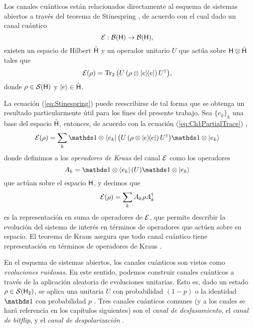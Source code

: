 Los canales cuánticos están relacionados directamente al esquema de sistemas abiertos a través del teorema de Stinespring \cite{Watrous}, de acuerdo con el cual dado un canal cuántico
\begin{equation}
    \mathcal{E}:\mathcal{B}({\sf H})\rightarrow \mathcal{B}({\sf H}),\nonumber
\end{equation}    
existen un espacio de Hilbert $\tilde {{\sf H}}$ y un operador unitario $U$ que actúa sobre ${\sf H}\otimes \tilde {{\sf H}}$ tales que
\begin{equation}\label{eq:Stinespring}
    \mcE(\rho)=\Tr_{2}\qty(U  \left(\rho \otimes \dyad{e}\right) U^{\dag}),
\end{equation}
donde $\rho\in\mathcal{S}({\sf H})$ y $\ket{e}\in \tilde {{\sf H}}$. \acnote{\checkmark}

La ecuación (\ref{eq:Stinespring}) puede reescribirse de tal forma que se obtenga un resultado particularmente útil para los fines del presente trabajo. Sea $\{e_{k}\}_{k}$ una base del espacio $\tilde {{\sf H}}$, entonces, de acuerdo con la ecuación (\ref{eq:Ch1PartialTrace}) \cite{Chuang},
\begin{equation}
    \mcE(\rho)=\sum_{k} \Id\otimes\bra{e_{k}} \qty(U  \left(\rho \otimes \dyad{e}\right) U^{\dag})\Id\otimes\ket{e_{k}}\nonumber
\end{equation}
donde definimos a los \textit{operadores de Kraus} del canal $\mathcal{E}$ como los operadores
\begin{equation}
    A_{k}=\Id\otimes\bra{e_{k}} \qty(U)\Id\otimes\ket{e_{k}}\nonumber
\end{equation}
que actúan sobre el espacio ${\sf H}$, y decimos que 
\begin{equation}
    \mathcal{E}(\rho)=\sum_{k}A_{k}\rho A^{\dagger}_{k}\nonumber
\end{equation}
es la representación en suma de operadores de $\mathcal{E}$, que permite describir la evolución del sistema de interés en términos de operadores que actúen sobre su espacio. El teorema de Kraus asegura que todo canal cuántico tiene representación en términos de operadores de Kraus \cite{Breuer}. 

En el esquema de sistemas abiertos, los canales cuánticos son vistos como \textit{evoluciones ruidosas}. En este sentido, podemos construir canales cuánticos a través de la aplicación aleatoria de evoluciones unitarias. Esto es, dado un estado $\rho\in\mathcal{S}({\sf H}_{2})$, se aplica una unitaria $U$ con probabilidad $(1-p)$ o la identidad $\Id$ con probabilidad $p$ \cite{Wilde}. Tres canales cuánticos comunes (y a los cuales se hará referencia en los capítulos siguientes) son el \textit{canal de desfasamiento}, el \textit{canal de bitflip}, y el \textit{canal de despolarización} \cite{Chuang}. 

